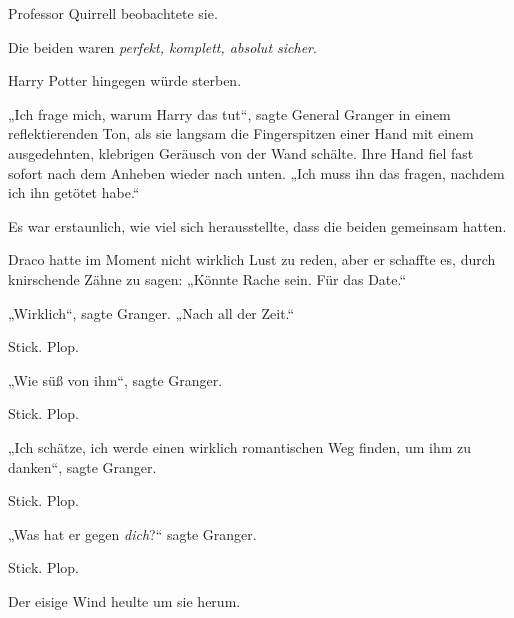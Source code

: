 Professor Quirrell beobachtete sie.

Die beiden waren \emph{perfekt, komplett, absolut sicher}.

Harry Potter hingegen würde sterben.

„Ich frage mich, warum Harry das tut“, sagte General Granger in einem reflektierenden Ton, als sie langsam die Fingerspitzen einer Hand mit einem ausgedehnten, klebrigen Geräusch von der Wand schälte. Ihre Hand fiel fast sofort nach dem Anheben wieder nach unten. „Ich muss ihn das fragen, nachdem ich ihn getötet habe.“

Es war erstaunlich, wie viel sich herausstellte, dass die beiden gemeinsam hatten.

Draco hatte im Moment nicht wirklich Lust zu reden, aber er schaffte es, durch knirschende Zähne zu sagen: „Könnte Rache sein. Für das Date.“

„Wirklich“, sagte Granger. „Nach all der Zeit.“

Stick. Plop.

„Wie süß von ihm“, sagte Granger.

Stick. Plop.

„Ich schätze, ich werde einen wirklich romantischen Weg finden, um ihm zu danken“, sagte Granger.

Stick. Plop.

„Was hat er gegen \emph{dich}?“ sagte Granger.

Stick. Plop.

Der eisige Wind heulte um sie herum.

\later

